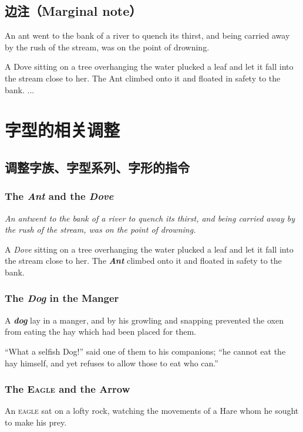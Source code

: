 \documentclass{report}
\begin{document}
\section{边注（Marginal note）}
An ant went to the bank of a river to quench its thirst, and
being carried away by the rush of the stream, was on the
point of drowning.

A Dove
sitting on a tree overhanging the water plucked a
leaf and let it fall into the stream close to her. The Ant
climbed onto it and floated in safety to the bank.
...


\chapter{字型的相关调整}
\section{调整字族、字型系列、字形的指令}
\subsection{The \textsl{Ant} and the \textsl{Dove}}

\itshape
An antwent to the bank of a river to quench its thirst, and
being carried away by the rush of the stream, was on the
point of drowning.
\upshape

A \textsl{Dove} sitting on a tree overhanging the water plucked a
leaf and let it fall into the stream close to her. The \textbf{\textsl{Ant}}
climbed onto it and floated in safety to the bank.

\subsection{The {\it Dog}\/ in the Manger}

A \textbf{\textit{dog}} lay in a manger, and by his growling and snapping
prevented the oxen from eating the hay which had been
placed for them.

``What a selfish Dog!'' said one of them to his companions;
``he cannot eat the hay himself, and yet refuses to allow
those to eat who can.''

\subsection{The \textsc{Eagle} and the Arrow}

An \textsc{eagle} sat on a lofty rock, watching the movements of a
Hare whom he sought to make his prey.
\end{document}
